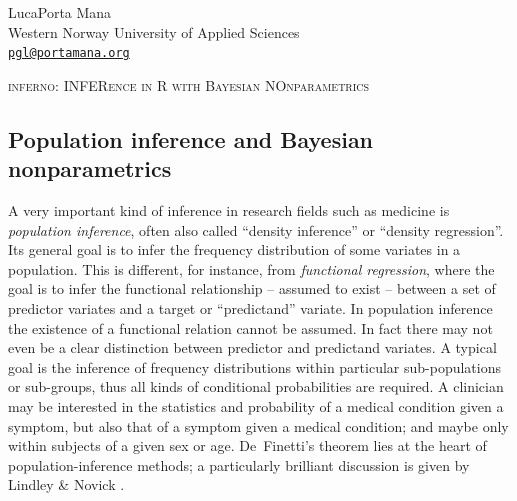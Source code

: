 

\newcommand{\citebi}{\cite}
\newcommand{\citein}{\cite}
\newcommand*{\subtitleproc}[1]{}
\newcommand*{\chapb}{}
\providecommand{\doi}[1]{}
\renewcommand{\doi}[1]{\href{https://doi.org/#1}{doi:#1}}
\newcommand*{\osfdoi}[1]{Open Science Framework \doi{#1}}
\newcommand*{\amp}{\&}
\renewcommand*{\P}{\mathrm{P}}%
\renewcommand*{\|}[1][]{\nonscript\:#1\vert\nonscript\:\mathopen{}}
\newcommand*{\mo}[1][=]{\mathclose{}\mathord{\nonscript\mkern0.5mu#1\nonscript\mkern0.5mu}\mathopen{}}
\newcommand*{\yF}{F}
\newcommand*{\yf}{f}
\newcommand*{\di}{\mathop{}\!\mathrm{d}}
\newcommand*{\HV}{\mathit{HV}}
\newcommand*{\GDS}{\mathit{GDS}}
\newcommand*{\cAD}{\mathit{cAD}}
\newcommand*{\yy}{\mathrm{Y}}
\newcommand*{\yn}{\mathrm{N}}


\begin{center}
  {\large Luca\enspace Porta Mana} \\
  Western Norway University of Applied Sciences\\
{\tt \href{mailto:pgl@portamana.org}{pgl@portamana.org}}


\Large
\textsc{inferno: INFERence in R with Bayesian NOnparametrics}
\end{center}

\subsection*{Population inference and Bayesian nonparametrics}
\label{sec:popinference}

A very important kind of inference in research fields such as medicine is \emph{population inference}, often also called ``density inference'' or ``density regression''. Its general goal is to infer the frequency distribution of some variates in a population. This is different, for instance, from \emph{functional regression}, where the goal is to infer the functional relationship -- assumed to exist -- between a set of predictor variates and a target or ``predictand'' variate. In population inference the existence of a functional relation cannot be assumed. In fact there may not even be a clear distinction between predictor and predictand variates. A typical goal is the inference of frequency distributions within particular sub-populations or sub-groups, thus all kinds of conditional probabilities are required. A clinician may be interested in the statistics and probability of a medical condition given a symptom, but also that of a symptom given a medical condition; and maybe only within subjects of a given sex or age. De~Finetti's theorem \citep[see e.g.][\S\S\,4.2, 4.3, 4.6]{bernardoetal1994_r2000} lies at the heart of population-inference methods; a particularly brilliant discussion is given by Lindley \& Novick \citeyearpar{lindleyetal1981}.

